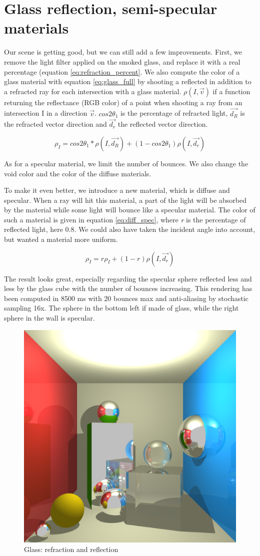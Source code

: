 \section{Glass reflection, semi-specular materials}
Our scene is getting good, but we can still add a few improvements. First, we remove the light filter applied on the smoked glass, and replace it with a real percentage (equation \ref{eq:refraction_percent}. We also compute the color of a glass material with equation \ref{eq:glass_full} by shooting a reflected in addition to a refracted ray for each intersection with a glass material. $\rho(I, \vec{v})$ if a function returning the reflectance (RGB color) of a point when shooting a ray from an intersection I in a direction $\vec{v}$. $cos2\theta_1$ is the percentage of refracted light, $\vec{d_R}$ is the refracted vector direction and $\vec{d_r}$ the reflected vector direction.

\begin{equation}
\rho_I = cos2\theta_1 * \rho(I, \vec{d_R}) + (1 - cos2\theta_1) \rho(I, \vec{d_r})
\label{eq:glass_full}
\end{equation}

As for a specular material, we limit the number of bounces. We also change the void color and the color of the diffuse materials.

To make it even better, we introduce a new material, which is diffuse and specular. When a ray will hit this material, a part of the light will be absorbed by the material while some light will bounce like a specular material. The color of such a material is given in equation \ref{eq:diff_spec}, where \textit{r} is the percentage of reflected light, here 0.8. We could also have taken the incident angle into account, but wanted a material more uniform.

\begin{equation}
\rho_I = r \rho_I + (1 - r) \rho(I, \vec{d_r})
\label{eq:diff_spec}
\end{equation}

The result looks great, especially regarding the specular sphere reflected less and less by the glass cube with the number of bounces increasing. This rendering has been computed in 8500 ms with 20 bounces max and anti-aliasing by stochastic sampling 16x. The sphere in the bottom left if made of glass, while the right sphere in the wall is specular.

\begin{figure}[H]
\centering
\includegraphics[width=0.35\linewidth]{img/glass_awesome.png}
\caption{Glass: refraction and reflection}
\end{figure}



